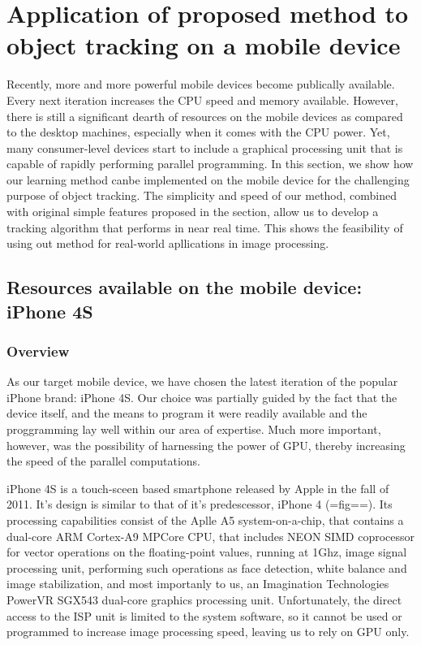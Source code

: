 
\chapter{Application of proposed method to object tracking on a mobile device} %

Recently, more and more powerful mobile devices become publically available. Every next iteration increases the CPU speed and memory available. However, there is still a significant dearth of resources on the mobile devices as compared to the desktop machines, especially when it comes with the CPU power. Yet, many consumer-level devices start to include a graphical processing unit that is capable of rapidly performing parallel programming. In this section, we show how our learning method canbe implemented on the mobile device for the challenging purpose of object tracking. The simplicity and speed of our method, combined with original simple features proposed in the section, allow us to develop a tracking algorithm that performs in near real time. This shows the feasibility of using out method for real-world apllications in image processing.
\section{Resources available on the mobile device: iPhone 4S}
\subsection{Overview}
As our target mobile device, we have chosen the latest iteration of the popular iPhone brand: iPhone 4S. Our choice was partially guided by the fact that the device itself, and the means to program it were readily available and the proggramming lay well within our area of expertise. Much more important, however, was the possibility of harnessing the power of GPU, thereby increasing the speed of the parallel computations.

iPhone 4S is a touch-sceen based smartphone released by Apple in the fall of 2011. It's design is similar to that of it's predescessor, iPhone 4 ({{=fig==}}). Its processing capabilities consist of the Aplle A5 system-on-a-chip, that contains a dual-core ARM Cortex-A9 MPCore CPU, that includes NEON SIMD coprocessor for vector operations on the floating-point values, running at 1Ghz, image signal processing unit, performing such operations as face detection, white balance and image stabilization, and most importanly to us, an Imagination Technologies PowerVR SGX543 dual-core  graphics processing unit. Unfortunately,  the direct access to the ISP unit is limited to the system software, so it cannot be used or programmed to increase image processing speed, leaving us to rely on GPU only.

